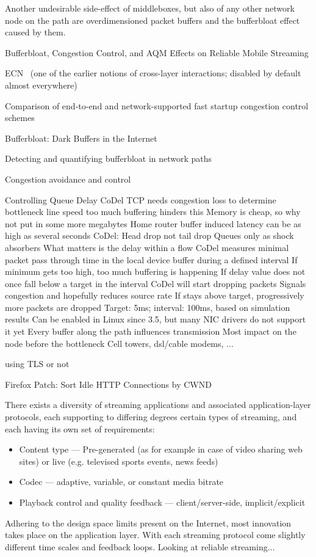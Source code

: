 Another undesirable side-effect of middleboxes, but also of any other network node on the path are overdimensioned packet buffers and the bufferbloat effect caused by them.

Bufferbloat, Congestion Control, and AQM Effects on Reliable Mobile Streaming

 ECN~\cite{rfc3168} (one of the earlier notions of cross-layer interactions; disabled by default almost everywhere)

Comparison of end-to-end and network-supported fast startup congestion control schemes \cite{scharf2011comparison}

Bufferbloat: Dark Buffers in the Internet \cite{gettys2011bufferbloat}

Detecting and quantifying bufferbloat in network paths \cite{groenewegen2011detecting}

Congestion avoidance and control \cite{jacobson1988congestion}

Controlling Queue Delay \cite{Nichols:2012:CQD:2209249.2209264} CoDel\cite{nichols2014codel}
 TCP needs congestion loss to determine bottleneck line speed
	too much buffering hinders this
 Memory is cheap, so why not put in some more megabytes
 Home router buffer induced latency can be as high as several seconds
CoDel:
 Head drop not tail drop
 Queues only as shock absorbers
 What matters is the delay within a flow
 CoDel measures minimal packet pass through time in the local device buffer during a defined interval
 If minimum gets too high, too much buffering is happening
 If delay value does not once fall below a target in the interval CoDel will start dropping packets
	Signals congestion and hopefully reduces source rate
	If stays above target, progressively more packets are dropped
	Target: 5ms; interval: 100ms, based on simulation results
 Can be enabled in Linux since 3.5, but many NIC drivers do not support it yet
 Every buffer along the path influences transmission
	Most impact on the node before the bottleneck
	Cell towers, dsl/cable modems, ...


using TLS or not

Firefox Patch: Sort Idle HTTP Connections by CWND \cite{ffSortCWND}

There exists a diversity of streaming applications and associated application-layer protocols, each supporting to differing degrees certain types of streaming, and each having its own set of requirements:
\begin{itemize}
\item Content type --- Pre-generated (as for example in case of video sharing web sites) or live (e.g. televised sports events, news feeds)
\item Codec --- adaptive, variable, or constant media bitrate
\item Playback control and quality feedback --- client/server-side, implicit/explicit
\end{itemize}
Adhering to the design space limits present on the Internet, most innovation takes place on the application layer.
With each streaming protocol come slightly different time scales and feedback loops. Looking at reliable streaming...


